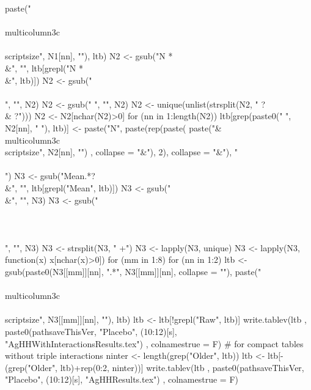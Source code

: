 \begin{Schunk}
\begin{Sinput}
{      paste("\\\\multicolumn{3}{c}{\\\\scriptsize", N1[nn], "}"), ltb)
  N2 <- gsub("N *\\&", "", ltb[grepl("N *\\&", ltb)])
  N2 <- gsub("\\\\", "", N2)
  N2 <- gsub(" ", "", N2)
  N2 <- unique(unlist(strsplit(N2, " ?\\& ?")))
  N2 <- N2[nchar(N2)>0]
  for (nn in 1:length(N2)) 
    ltb[grep(paste0(" ", N2[nn], " "), ltb)] <- 
      paste("N", paste(rep(paste(
      paste("& \\multicolumn{3}{c}{\\scriptsize",  N2[nn], "}")
      , collapse = "&"), 2), collapse = "&"), "\\\\")
  N3 <- gsub("Mean.*?\\&", "", ltb[grepl("Mean", ltb)])
  N3 <- gsub("\\&", "", N3)
  N3 <- gsub("\\\\\\\\", "", N3)
  N3 <- strsplit(N3, " +")
  N3 <- lapply(N3, unique)
  N3 <- lapply(N3, function(x) x[nchar(x)>0])
  for (mm in 1:8)
    for (nn in 1:2) 
      ltb <- gsub(paste0(N3[[mm]][nn], ".*", N3[[mm]][nn], collapse = ""), 
        paste("\\\\multicolumn{3}{c}{\\\\scriptsize", N3[[mm]][nn], "}"), ltb)
  ltb <- ltb[!grepl("Raw", ltb)]
  write.tablev(ltb
    ,  paste0(pathsaveThisVer, "Placebo", (10:12)[s], "AgHHWithInteractionsResults.tex")
    ,  colnamestrue = F)
  # for compact tables without triple interactions
  ninter <- length(grep("Older", ltb))
  ltb <- ltb[-(grep("Older", ltb)+rep(0:2, ninter))]
  write.tablev(ltb
    ,  paste0(pathsaveThisVer, "Placebo", (10:12)[s], "AgHHResults.tex")
    ,  colnamestrue = F)
}
\end{Sinput}
\end{Schunk}
